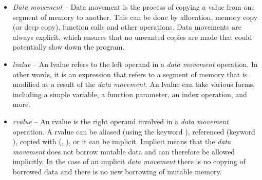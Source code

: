 \begin{itemize}
  \setlength\itemsep{-4pt}
\item \textit{Data movement} -- Data movement is the process of copying a value
  from one segment of memory to another. This can be done by allocation, memory
  copy (or deep copy), function calls and other operations. Data movements are
  always explicit, which ensures that no unwanted copies are made that could
  potentially slow down the program.

\item \textit{lvalue} -- An lvalue refers to the left operand in a \textit{data
  movement} operation. In other words, it is an expression that refers to a
  segment of memory that is modified as a result of the \textit{data movement}.
  An lvalue can take various forms, including a simple variable, a function
  parameter, an index operation, and more.

\item \textit{rvalue} -- An rvalue is the right operand involved in a
  \textit{data movement} operation. A rvalue can be aliased (using the keyword
  ), referenced (keyword ), copied with
  (, ), or it can be implicit. Implicit means that
  the \textit{data movement} does not borrow mutable data and can therefore be
  allowed implicitly. In the case of an implicit \textit{data movement} there is
  no copying of borrowed data and there is no new borrowing of mutable memory.

\end{itemize}






